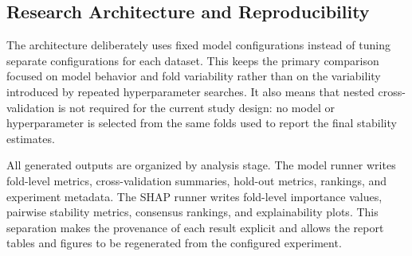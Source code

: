 \subsection{Research Architecture and Reproducibility}

The architecture deliberately uses fixed model configurations instead of tuning separate configurations for each dataset. This keeps the primary comparison focused on model behavior and fold variability rather than on the variability introduced by repeated hyperparameter searches. It also means that nested cross-validation is not required for the current study design: no model or hyperparameter is selected from the same folds used to report the final stability estimates.

All generated outputs are organized by analysis stage. The model runner writes fold-level metrics, cross-validation summaries, hold-out metrics, rankings, and experiment metadata. The SHAP runner writes fold-level importance values, pairwise stability metrics, consensus rankings, and explainability plots. This separation makes the provenance of each result explicit and allows the report tables and figures to be regenerated from the configured experiment.
